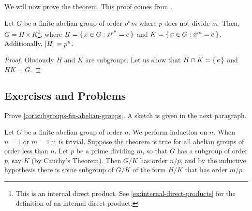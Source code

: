 \documentclass[./main.tex]{subfiles}
\begin{document}
We will now prove the theorem. This proof comes from \autocite[Ch~11]{Gallian_2020}. 

\begin{lemma}
    Let $G$ be a finite abelian group of order $p^n m$ where $p$ does not divide
    $m$. Then, $G = H \times K$\footnote{This is an internal direct product. See
    \cref{ex:internal-direct-products} for the definition of an internal direct
    product.}, where $H = \set{x \in G: x^{p^n} = e}$ and $K = \set{x \in G: x^m
    = e}$. Additionally, $\abs H = p^n$.
\end{lemma}
\begin{proof}
    Obviously $H$ and $K$ are subgroups. Let us show that $H \cap K = \set{e}$
    and $HK = G$. 
\end{proof}


\subsection{Exercises and Problems}

\begin{exercise}
\label{ex:subgroups-fin-abelian-groups}
Prove \cref{cor:subgroups-fin-abelian-groups}. A sketch is given in the next paragraph.

Let $G$ be a finite abelian group of order $n$. We perform induction on $n$.
When $n=1$ or $m=1$ it is trivial. Suppose the theorem is true for all abelian
groups of order less than $n$. Let $p$ be a prime dividing $m$, so that $G$ has
a subgroup of order $p$, say $K$ (by Cauchy's Theorem). Then $G/K$ has order
$n/p$, and by the inductive hypothesis there is some subgroup of $G/K$ of the
form $H/K$ that has order $m/p$.
\end{exercise}
\end{document}
